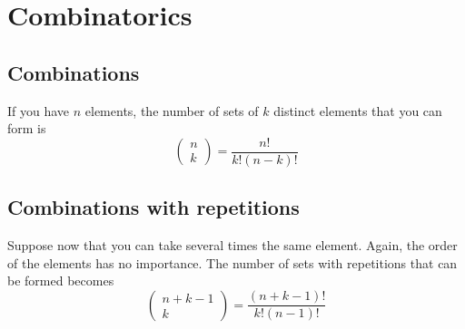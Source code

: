 \section{Combinatorics}
\subsection{Combinations}

If you have $n$ elements, the number of sets of $k$ distinct elements that you can form is
\begin{equation}
    \left( \begin{array}{c}
        n \\ k
    \end{array} \right)
     = \frac{n!}{k!(n-k)!}
\end{equation}

\subsection{Combinations with repetitions}

Suppose now that you can take several times the same element. Again, the order of the elements has no importance. The number of sets with repetitions that can be formed becomes
\begin{equation}
    \left(\begin{array}{c}
        n+k-1 \\ k
    \end{array} \right)
     = \frac{(n+k-1)!}{k!(n-1)!}
\end{equation}
